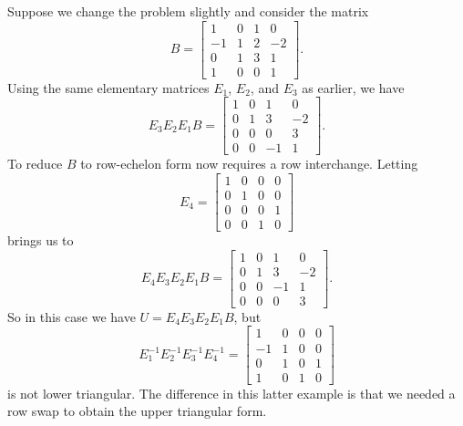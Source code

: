 Suppose we change the problem slightly and consider the matrix
\[B = \left[ \begin{array}{rccr} 1&0&1&0\\-1&1&2&-2 \\0&1&3&1\\1&0&0&1\end{array}  \right].\]
Using the same elementary matrices $E_1$, $E_2$, and $E_3$ as earlier, we have
\[E_3E_2E_1B = \left[ \begin{array}{ccrr} 1&0&1&0\\0&1&3&-2 \\0&0&0&3\\0&0&-1&1\end{array}  \right].\]
To reduce $B$ to row-echelon form now requires a row interchange. Letting
\[E_4 = \left[ \begin{array}{crcc} 1&0&0&0\\0&1&0&0 \\0&0&0&1\\0&0&1&0\end{array}  \right]\]
brings us to
\[E_4E_3E_2E_1B = \left[ \begin{array}{ccrr} 1&0&1&0\\0&1&3&-2 \\0&0&-1&1\\0&0&0&3\end{array}  \right].\]
So in this case we have $U = E_4E_3E_2E_1B$, but
\[E_1^{-1}E_2^{-1}E_3^{-1}E_4^{-1} = \left[ \begin{array}{rccc} 1&0&0&0\\-1&1&0&0 \\0&1&0&1\\1&0&1&0\end{array}  \right]\]
is not lower triangular. The difference in this latter example is that we needed a row swap to obtain the upper triangular form. 

\label{sec:det_prop_exam}

\ExampleIntro

